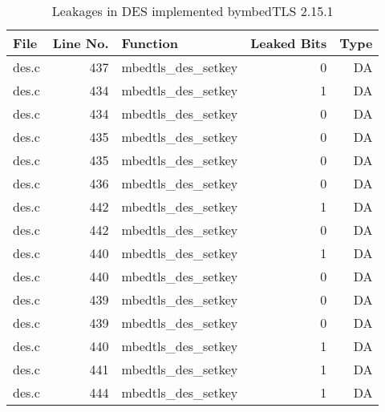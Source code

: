 \begin{table}%
\centering\tiny\scriptsize
\renewcommand{\baselinestretch}{0.96}\selectfont
\caption{Leakages in DES implemented bymbedTLS 2.15.1}\label{tab:DESmbedTLS2.15.1}
\begin{tabular}{lrlrr}
\hline
\textbf{File} & \textbf{Line No.} & \textbf{Function} & \textbf{Leaked Bits} & \textbf{Type} \\\hline
des.c& 437&mbedtls\_des\_setkey&0 &DA\\
des.c& 434&mbedtls\_des\_setkey&1 &DA\\
des.c& 434&mbedtls\_des\_setkey&0 &DA\\
des.c& 435&mbedtls\_des\_setkey&0 &DA\\
des.c& 435&mbedtls\_des\_setkey&0 &DA\\
des.c& 436&mbedtls\_des\_setkey&0 &DA\\
des.c& 442&mbedtls\_des\_setkey&1 &DA\\
des.c& 442&mbedtls\_des\_setkey&0 &DA\\
des.c& 440&mbedtls\_des\_setkey&1 &DA\\
des.c& 440&mbedtls\_des\_setkey&0 &DA\\
des.c& 439&mbedtls\_des\_setkey&0 &DA\\
des.c& 439&mbedtls\_des\_setkey&0 &DA\\
des.c& 440&mbedtls\_des\_setkey&1 &DA\\
des.c& 441&mbedtls\_des\_setkey&1 &DA\\
des.c& 444&mbedtls\_des\_setkey&1 &DA\\
\hline
\end{tabular}
\renewcommand{\baselinestretch}{1.0}\selectfont
\end{table}
